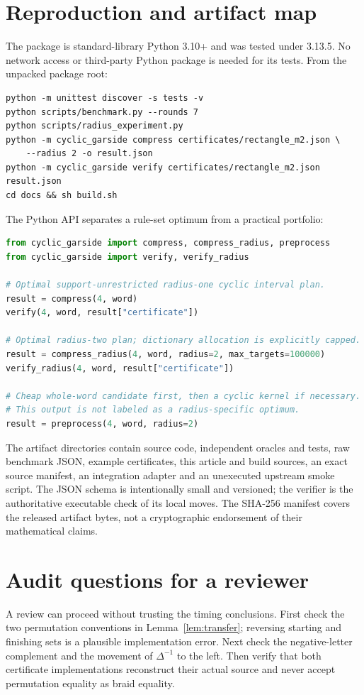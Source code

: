 \documentclass[11pt,a4paper]{article}
\theoremstyle{definition}\newtheorem{definition}[theorem]{Definition}
\theoremstyle{remark}\newtheorem{remark}[theorem]{Remark}
\begin{document}
\section{Reproduction and artifact map}
The package is standard-library Python 3.10+ and was tested under 3.13.5.
No network access or third-party Python package is needed for its tests.
From the unpacked package root:
\begin{lstlisting}
python -m unittest discover -s tests -v
python scripts/benchmark.py --rounds 7
python scripts/radius_experiment.py
python -m cyclic_garside compress certificates/rectangle_m2.json \
    --radius 2 -o result.json
python -m cyclic_garside verify certificates/rectangle_m2.json result.json
cd docs && sh build.sh
\end{lstlisting}
The Python API separates a rule-set optimum from a practical portfolio:
\begin{lstlisting}[language=Python]
from cyclic_garside import compress, compress_radius, preprocess
from cyclic_garside import verify, verify_radius

# Optimal support-unrestricted radius-one cyclic interval plan.
result = compress(4, word)
verify(4, word, result["certificate"])

# Optimal radius-two plan; dictionary allocation is explicitly capped.
result = compress_radius(4, word, radius=2, max_targets=100000)
verify_radius(4, word, result["certificate"])

# Cheap whole-word candidate first, then a cyclic kernel if necessary.
# This output is not labeled as a radius-specific optimum.
result = preprocess(4, word, radius=2)
\end{lstlisting}

The artifact directories contain source code, independent oracles and tests,
raw benchmark JSON, example certificates, this article and build sources,
an exact source manifest, an integration adapter and an unexecuted upstream
smoke script. The JSON schema is intentionally small and versioned; the
verifier is the authoritative executable check of its local moves.
The SHA-256 manifest covers the released artifact bytes, not a cryptographic
endorsement of their mathematical claims.

\section{Audit questions for a reviewer}
A review can proceed without trusting the timing conclusions. First check
the two permutation conventions in Lemma~\ref{lem:transfer}; reversing
starting and finishing sets is a plausible implementation error. Next check
the negative-letter complement and the movement of $\Delta^{-1}$ to the
left. Then verify that both certificate implementations reconstruct their
actual source and never accept permutation equality as braid equality.
\end{document}
